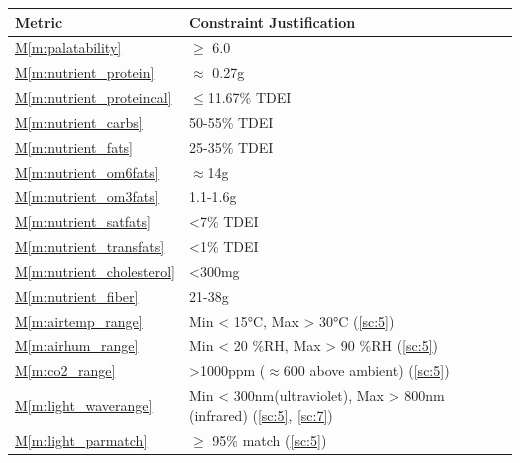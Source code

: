\documentclass{report}
\newcommand{\mref}[1]{\hyperref[#1]{M\ref{#1}}}
\begin{document}
\begin{tabular}{|l|p{14.35cm}|}
    \hline
    \textbf{Metric} & \textbf{Constraint \hfill Justification} \\
    \hline
    \mref{m:palatability} & $\ge$ 6.0 \hfill \cite{applicantguide,dsfc-phase2}\\
    \hline
    \mref{m:nutrient_protein} & $\approx$ 0.27g \hfill \cite{applicantguide,dsfc-phase2,nutrition}\\
    \hline
    \mref{m:nutrient_proteincal} & $\le$11.67\% TDEI \hfill \cite{applicantguide,dsfc-phase2,nutrition}\\
    \hline
    \mref{m:nutrient_carbs} & 50-55\% TDEI \hfill \cite{applicantguide,dsfc-phase2,nutrition}\\
    \hline
    \mref{m:nutrient_fats} & 25-35\% TDEI \hfill \cite{applicantguide,dsfc-phase2,nutrition}\\
    \hline
    \mref{m:nutrient_om6fats} & $\approx$14g \hfill \cite{applicantguide,dsfc-phase2,nutrition}\\
    \hline
    \mref{m:nutrient_om3fats} & 1.1-1.6g \hfill \cite{applicantguide,dsfc-phase2,nutrition}\\
    \hline
    \mref{m:nutrient_satfats} & <7\% TDEI \hfill \cite{applicantguide,dsfc-phase2,nutrition}\\
    \hline
    \mref{m:nutrient_transfats} & <1\% TDEI \hfill \cite{applicantguide,dsfc-phase2,nutrition}\\
    \hline
    \mref{m:nutrient_cholesterol} & <300mg \hfill \cite{applicantguide,dsfc-phase2,nutrition}\\
    \hline
    \mref{m:nutrient_fiber} & 21-38g \hfill \cite{applicantguide,dsfc-phase2,nutrition}\\
    \hline
    \mref{m:airtemp_range} & Min < 15°C, Max > 30°C \hfill (\ref{sc:5})\\
    \hline
    \mref{m:airhum_range} & Min < 20 \%RH, Max > 90 \%RH \hfill (\ref{sc:5}) \\
    \hline
    \mref{m:co2_range} & >1000ppm ($\approx$600 above ambient) \hfill (\ref{sc:5}) \\
    \hline
    \mref{m:light_waverange} & Min < 300nm\footnotemark[6] (ultraviolet), Max > 800nm (infrared) \hfill (\ref{sc:5}, \ref{sc:7}) \cite{uvc-disinfection} \\
    \hline
    \mref{m:light_parmatch} & $\ge$ 95\% match \hfill (\ref{sc:5}) \\

\end{tabular}
\end{document}
